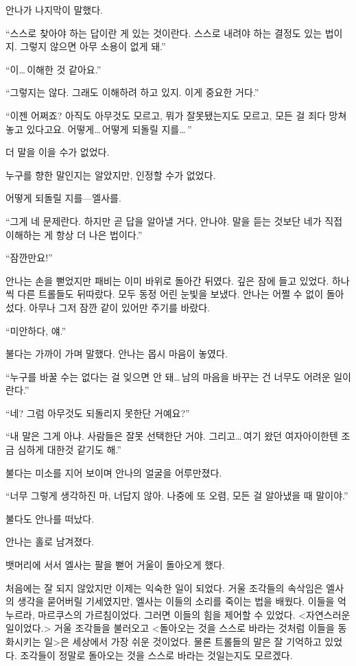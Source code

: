 안나가 나지막이 말했다.

``스스로 찾아야 하는 답이란 게 있는 것이란다. 스스로 내려야 하는 결정도 있는 법이지. 그렇지 않으면 아무 소용이 없게 돼.''

``이\ldots\,이해한 것 같아요.''

``그렇지는 않다. 그래도 이해하려 하고 있지. 이게 중요한 거다.''

``이젠 어쩌죠? 아직도 아무것도 모르고, 뭐가 잘못됐는지도 모르고, 모든 걸 죄다 망쳐놓고 있다고요. 어떻게\ldots\,어떻게 되돌릴 지를\ldots\,''

더 말을 이을 수가 없었다.

누구를 향한 말인지는 알았지만, 인정할 수가 없었다.

어떻게 되돌릴 지를—엘사를.

``그게 네 문제란다. 하지만 곧 답을 알아낼 거다, 안나야. 말을 듣는 것보단 네가 직접 이해하는 게 항상 더 나은 법이다.''

``잠깐만요!''

안나는 손을 뻗었지만 패비는 이미 바위로 돌아간 뒤였다. 깊은 잠에 들고 있었다. 하나씩 다른 트롤들도 뒤따랐다. 모두 동정 어린 눈빛을 보냈다. 안나는 어쩔 수 없이 돌아섰다. 아무나 그저 잠깐 같이 있어만 주기를 바랐다.

``미안하다, 얘.''

불다는 가까이 가며 말했다. 안나는 몹시 마음이 놓였다.

``누구를 바꿀 수는 없다는 걸 잊으면 안 돼\ldots\,남의 마음을 바꾸는 건 너무도 어려운 일이란다.''

``네? 그럼 아무것도 되돌리지 못한단 거예요?''

``내 말은 그게 아냐. 사람들은 잘못 선택한단 거야. 그리고\ldots\,여기 왔던 여자아이한텐 조금 심하게 대한것 같기도 해.''

불다는 미소를 지어 보이며 안나의 얼굴을 어루만졌다.

``너무 그렇게 생각하진 마, 너답지 않아. 나중에 또 오렴, 모든 걸 알아냈을 때 말이야.''

불다도 안나를 떠났다.

안나는 홀로 남겨졌다.

\textbreak

뱃머리에 서서 엘사는 팔을 뻗어 거울이 돌아오게 했다.

처음에는 잘 되지 않았지만 이제는 익숙한 일이 되었다. 거울 조각들의 속삭임은 엘사의 생각을 묻어버릴 기세였지만, 엘사는 이들의 소리를 죽이는 법을 배웠다. 이들을 억누르라, 마르쿠스의 가르침이었다. 그러면 이들의 힘을 제어할 수 있었다. <자연스러운 일이었다.> 거울 조각들을 불러오고 <돌아오는 것을 스스로 바라는 것처럼 이들을 동화시키는 일>은 세상에서 가장 쉬운 것이었다. 물론 트롤들의 말은 잘 기억하고 있었다. 조각들이 정말로 돌아오는 것을 스스로 바라는 것일는지도 모르겠다. %

